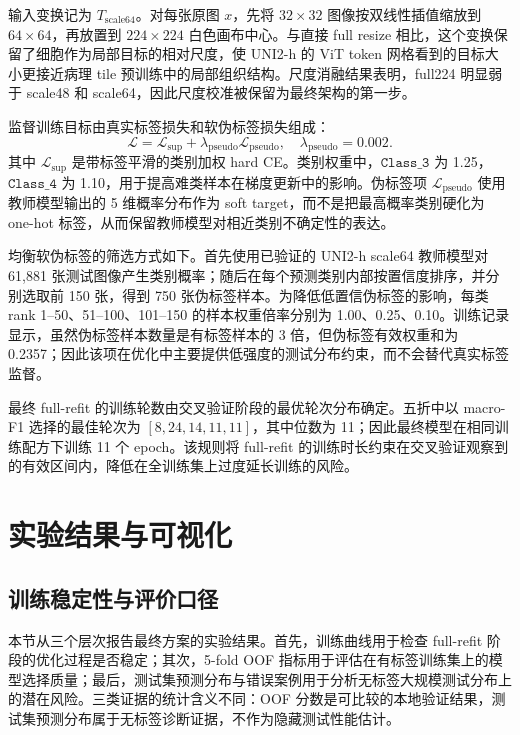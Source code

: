 \documentclass[a4paper,12pt]{article}
\newcommand{\cls}[1]{\texttt{Class\_#1}}
\begin{document}
输入变换记为 \(T_{\mathrm{scale64}}\)。对每张原图 \(x\)，先将 \(32\times32\) 图像按双线性插值缩放到 \(64\times64\)，再放置到 \(224\times224\) 白色画布中心。与直接 full resize 相比，这个变换保留了细胞作为局部目标的相对尺度，使 UNI2-h 的 ViT token 网格看到的目标大小更接近病理 tile 预训练中的局部组织结构。尺度消融结果表明，full224 明显弱于 scale48 和 scale64，因此尺度校准被保留为最终架构的第一步。

监督训练目标由真实标签损失和软伪标签损失组成：
\begin{equation}
    \mathcal{L}
    =
    \mathcal{L}_{\mathrm{sup}}
    +
    \lambda_{\mathrm{pseudo}}\mathcal{L}_{\mathrm{pseudo}},
    \quad
    \lambda_{\mathrm{pseudo}}=0.002.
\end{equation}
其中 \(\mathcal{L}_{\mathrm{sup}}\) 是带标签平滑的类别加权 hard CE。类别权重中，\(\cls{3}\) 为 1.25，\(\cls{4}\) 为 1.10，用于提高难类样本在梯度更新中的影响。伪标签项 \(\mathcal{L}_{\mathrm{pseudo}}\) 使用教师模型输出的 5 维概率分布作为 soft target，而不是把最高概率类别硬化为 one-hot 标签，从而保留教师模型对相近类别不确定性的表达。

均衡软伪标签的筛选方式如下。首先使用已验证的 UNI2-h scale64 教师模型对 61,881 张测试图像产生类别概率；随后在每个预测类别内部按置信度排序，并分别选取前 150 张，得到 750 张伪标签样本。为降低低置信伪标签的影响，每类 rank 1--50、51--100、101--150 的样本权重倍率分别为 1.00、0.25、0.10。训练记录显示，虽然伪标签样本数量是有标签样本的 3 倍，但伪标签有效权重和为 0.2357；因此该项在优化中主要提供低强度的测试分布约束，而不会替代真实标签监督。

最终 full-refit 的训练轮数由交叉验证阶段的最优轮次分布确定。五折中以 macro-F1 选择的最佳轮次为 \([8,24,14,11,11]\)，其中位数为 11；因此最终模型在相同训练配方下训练 11 个 epoch。该规则将 full-refit 的训练时长约束在交叉验证观察到的有效区间内，降低在全训练集上过度延长训练的风险。

\section{实验结果与可视化}

\subsection{训练稳定性与评价口径}

本节从三个层次报告最终方案的实验结果。首先，训练曲线用于检查 full-refit 阶段的优化过程是否稳定；其次，5-fold OOF 指标用于评估在有标签训练集上的模型选择质量；最后，测试集预测分布与错误案例用于分析无标签大规模测试分布上的潜在风险。三类证据的统计含义不同：OOF 分数是可比较的本地验证结果，测试集预测分布属于无标签诊断证据，不作为隐藏测试性能估计。
\end{document}
